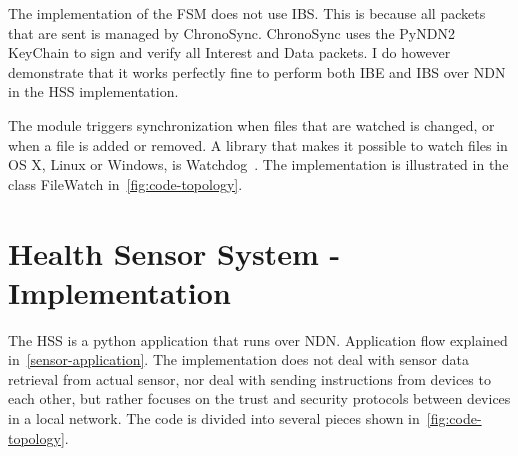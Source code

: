 The implementation of the \gls{FSM} does not use \gls{IBS}. 
This is because all packets that are sent is managed by ChronoSync. 
ChronoSync uses the PyNDN2 KeyChain to sign and verify all Interest and Data packets.
I do however demonstrate that it works perfectly fine to perform both \gls{IBE} and \gls{IBS} over \gls{NDN} in the \gls{HSS} implementation.




The module triggers synchronization when files that are watched is changed, or when a file is added or removed.
A library that makes it possible to watch files in OS X, Linux or Windows, is Watchdog~\cite{watchdog}. 
The implementation is illustrated in the class FileWatch in~\autoref{fig:code-topology}.

\section{Health Sensor System - Implementation}
The \gls{HSS} is a python application that runs over \gls{NDN}.
Application flow explained in~\autoref{sensor-application}.
The implementation does not deal with sensor data retrieval from actual sensor, nor deal with sending instructions from devices to each other, but rather focuses on the trust and security protocols between devices in a local network.
The code is divided into several pieces shown in~\autoref{fig:code-topology}.

